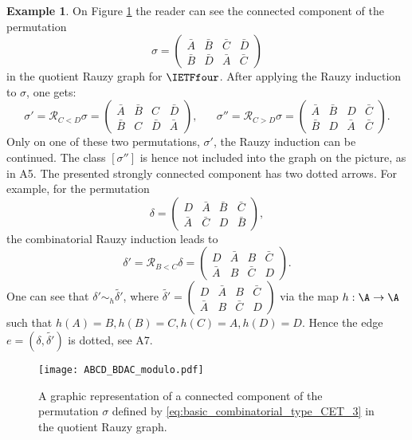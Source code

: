 \documentclass[12pt]{article}
\theoremstyle{definition}
\newtheorem*{example}{Example}
\begin{document}
\begin{example}
On Figure \ref{pic:graph_for_four} the reader can see the connected component of the permutation 
\begin{equation}\label{eq:basic_combinatorial_type_CET_3}
\sigma=\begin{pmatrix}
\bar{A}&\bar{B}&\bar{C}&\bar{D}\\
\bar{B}&\bar{D}&\bar{A}&\bar{C}
\end{pmatrix}
\end{equation}
in the quotient Rauzy graph for $\IETFfour$. 
After applying the Rauzy induction to $\sigma$, one gets:
\begin{equation*}
\sigma'=\mathcal{R}_{C<D} \sigma=\begin{pmatrix}
\bar{A}&\bar{B}&{C}&\bar{D}\\
\bar{B}&C&\bar{D}&\bar{A}
\end{pmatrix}, \; \; \;  \; \; \; \sigma''=\mathcal{R}_{C>D} \sigma=\begin{pmatrix}
\bar{A}&\bar{B}&D&\bar{C}\\
\bar{B}&{D}&\bar{A}&\bar{C}
\end{pmatrix}.
\end{equation*}
 Only on one of these two permutations, $\sigma'$, the Rauzy induction can be continued. The class $[\sigma'']$ is hence not included into the graph on the picture, as in A5. The presented strongly connected component has two dotted arrows. For example,
for the permutation 
\begin{equation*}
\delta=\begin{pmatrix}
D&\bar{A}&\bar{B}&\bar{C}\\
\bar{A}&\bar{C}&D&\bar{B}
\end{pmatrix},
\end{equation*}
the combinatorial Rauzy induction leads to
\begin{equation*}
\delta'=\mathcal{R}_{B<C} \delta=\begin{pmatrix}
D&\bar{A}&{B}&\bar{C}\\
\bar{A}&B&\bar{C}&D
\end{pmatrix}.
\end{equation*}
One can see that $\delta'\sim_h \tilde{\delta'}$, where $\tilde{\delta'}=
\begin{pmatrix}
D&\bar{A}&{B}&\bar{C}\\
\bar{A}&B&\bar{C}&D
\end{pmatrix}
$ via the map $h: \A \rightarrow \A$ such that $h(A)=B, h(B)=C, h(C)=A, h(D)=D$. Hence the edge $e=(\delta,\tilde{\delta'})$ is dotted, see A7.

\begin{figure}
\texttt{[image: ABCD\_BDAC\_modulo.pdf]}
\caption{A graphic representation of a connected component of the permutation $\sigma$ defined by \eqref{eq:basic_combinatorial_type_CET_3} in the quotient Rauzy graph.}
\label{pic:graph_for_four}
\end{figure}
\end{example}
\end{document}
